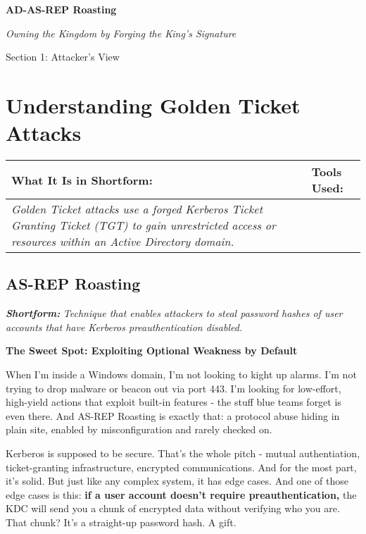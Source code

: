 
\textbf{AD-AS-REP Roasting}

\textit{Owning the Kingdom by Forging the King’s Signature}

Section 1: Attacker’s View

\section{\textbf{Understanding Golden Ticket Attacks}}

\begin{table}
\justifying

\begin{tabular}{| l | l |}
\hline
\textbf{What It Is in Shortform:} & \textbf{Tools Used:} \\
\hline
\textit{Golden Ticket attacks use a forged Kerberos Ticket Granting Ticket (TGT) to gain unrestricted access or resources within an Active Directory domain.} &  \\
\hline

\end{tabular}

\end{table}

\subsection{\textbf{AS-REP Roasting}}

\textit{\textbf{Shortform: }}\textit{Technique that enables attackers to steal password hashes of user accounts that have Kerberos preauthentication disabled.}

\textbf{The Sweet Spot: Exploiting Optional Weakness by Default}

When I’m inside a Windows domain, I’m not looking to kight up alarms. I’m not trying to drop malware or beacon out via port 443. I’m looking for low-effort, high-yield actions that exploit built-in features - the stuff blue teams forget is even there. And AS-REP Roasting is exactly that: a protocol abuse hiding in plain site, enabled by misconfiguration and rarely checked on.

Kerberos is supposed to be secure. That’s the whole pitch - mutual authentiation, ticket-granting infrastructure, encrypted communications. And for the most part, it’s solid. But just like any complex system, it has edge cases. And one of those edge cases is this: \textbf{if a user account doesn’t require preauthentication, }the KDC will send you a chunk of encrypted data without verifying who you are. That chunk? It’s a straight-up password hash. A gift.

